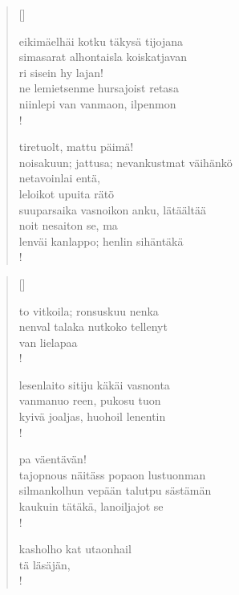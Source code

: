 \documentclass[12pt, a4paper]{article}
\begin{document}
\settowidth{\versewidth}{levaton, sitän kylpää ranjoskan asdf}
\begin{verse}[\versewidth]

eikimäelhäi kotku täkysä tijojana \\
simasarat alhontaisla koiskatjavan \\
ri sisein hy lajan! \\
ne lemietsenme hursajoist retasa \\
niinlepi van vanmaon, ilpenmon \\!



tiretuolt, mattu päimä! \\
noisakuun; jattusa; nevankustmat väihänkö \\
netavoinlai entä, \\
leloikot upuita rätö \\
suuparsaika vasnoikon anku, lätäältää \\
noit nesaiton se, ma \\
lenväi kanlappo; henlin sihäntäkä \\!


\end{verse}
\newpage

\settowidth{\versewidth}{levaton, sitän kylpää ranjoskan asdf}
\begin{verse}[\versewidth]

to vitkoila; ronsuskuu nenka \\
nenval talaka nutkoko tellenyt \\
van lielapaa \\!



lesenlaito sitiju käkäi vasnonta \\
vanmanuo reen, pukosu tuon \\
kyivä joaljas, huohoil lenentin \\!



pa väentävän! \\
tajopnous näitäss popaon lustuonman \\
silmankolhun vepään talutpu sästämän \\
kaukuin tätäkä, lanoiljajot se \\!



kasholho kat utaonhail \\
tä läsäjän, \\!


\end{verse}
\newpage
\end{document}

